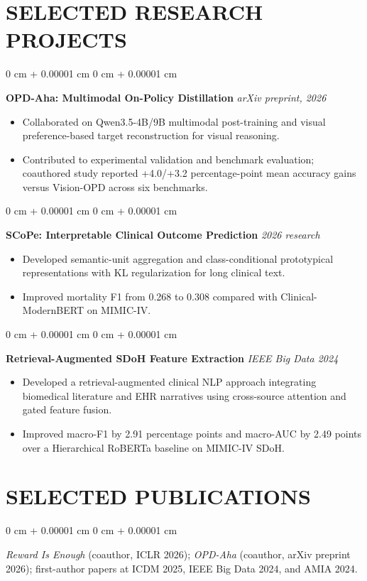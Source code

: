 \documentclass[10pt, letterpaper]{article}
\newenvironment{highlights}{
    \begin{itemize}[
        topsep=0.03 cm,
        parsep=0.02 cm,
        partopsep=0pt,
        itemsep=0pt,
        leftmargin=0 cm + 10pt
    ]
}{
    \end{itemize}
} %
\newenvironment{onecolentry}{
    \begin{adjustwidth}{
        0 cm + 0.00001 cm
    }{
        0 cm + 0.00001 cm
    }
}{
    \end{adjustwidth}
} %
\begin{document}
\section{SELECTED RESEARCH PROJECTS}
\begin{onecolentry}
\textbf{OPD-Aha: Multimodal On-Policy Distillation} \hfill \textit{arXiv preprint, 2026}
\begin{highlights}
\item Collaborated on Qwen3.5-4B/9B multimodal post-training and visual preference-based target reconstruction for visual reasoning.
\item Contributed to experimental validation and benchmark evaluation; coauthored study reported +4.0/+3.2 percentage-point mean accuracy gains versus Vision-OPD across six benchmarks.
\end{highlights}
\end{onecolentry}
\vspace{0.02 cm}
\begin{onecolentry}
\textbf{SCoPe: Interpretable Clinical Outcome Prediction} \hfill \textit{2026 research}
\begin{highlights}
\item Developed semantic-unit aggregation and class-conditional prototypical representations with KL regularization for long clinical text.
\item Improved mortality F1 from 0.268 to 0.308 compared with Clinical-ModernBERT on MIMIC-IV.
\end{highlights}
\end{onecolentry}
\vspace{0.02 cm}
\begin{onecolentry}
\textbf{Retrieval-Augmented SDoH Feature Extraction} \hfill \textit{IEEE Big Data 2024}
\begin{highlights}
\item Developed a retrieval-augmented clinical NLP approach integrating biomedical literature and EHR narratives using cross-source attention and gated feature fusion.
\item Improved macro-F1 by 2.91 percentage points and macro-AUC by 2.49 points over a Hierarchical RoBERTa baseline on MIMIC-IV SDoH.
\end{highlights}
\end{onecolentry}
\vspace{0.02 cm}
\section{SELECTED PUBLICATIONS}
\begin{onecolentry}
\textit{Reward Is Enough} (coauthor, ICLR 2026); \textit{OPD-Aha} (coauthor, arXiv preprint 2026); first-author papers at ICDM 2025, IEEE Big Data 2024, and AMIA 2024.
\end{onecolentry}
\end{document}
